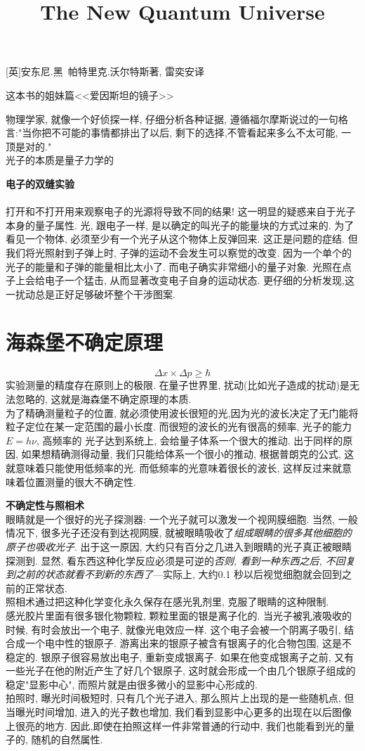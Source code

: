 \documentclass{article}
\begin{document}
\title{The New Quantum Universe}
[英]安东尼.黑\ 帕特里克.沃尔特斯著, 雷奕安译

这本书的姐妹篇<<爱因斯坦的镜子>>

物理学家, 就像一个好侦探一样, 仔细分析各种证据, 遵循福尔摩斯说过的一句格言:"当你把不可能的事情都排出了以后, 剩下的选择,不管看起来多么不太可能, 一顶是对的."  \\
光子的本质是量子力学的

\textbf{电子的双缝实验}\\
\\
打开和不打开用来观察电子的光源将导致不同的结果! 这一明显的疑惑来自于光子本身的量子属性. 光, 跟电子一样, 是以确定的叫光子的能量块的方式过来的. 为了看见一个物体, 必须至少有一个光子从这个物体上反弹回来. 这正是问题的症结. 但我们将光照射到子弹上时, 子弹的运动不会发生可以察觉的改变. 因为一个单个的光子的能量和子弹的能量相比太小了. 而电子确实非常细小的量子对象. 光照在点子上会给电子一个猛击, 从而显著改变电子自身的运动状态. 更仔细的分析发现,这一扰动总是正好足够破坏整个干涉图案.
\bigskip

\section{海森堡不确定原理}
$$
\Delta x\times \Delta p \geq \hbar
$$
实验测量的精度存在原则上的极限. 在量子世界里, 扰动(比如光子造成的扰动)是无法忽略的, 这就是海森堡不确定原理的本质.\\
为了精确测量粒子的位置, 就必须使用波长很短的光,因为光的波长决定了无门能将粒子定位在某一定范围的最小长度. 而很短的波长的光有很高的频率, 光子的能力$E=h\nu$, 高频率的
光子达到系统上, 会给量子体系一个很大的推动. 出于同样的原因, 如果想精确测得动量, 我们只能给体系一个很小的推动, 根据普朗克的公式, 这就意味着只能使用低频率的光. 而低频率的光意味着很长的波长, 这样反过来就意味着位置测量的很大不确定性.
\bigskip

\textbf{不确定性与照相术}\\
眼睛就是一个很好的光子探测器: 一个光子就可以激发一个视网膜细胞. 当然, 一般情况下, 很多光子还没有到达视网膜, 就被眼睛吸收了\textit{组成眼睛的很多其他细胞的原子也吸收光子}.
出于这一原因, 大约只有百分之几进入到眼睛的光子真正被眼睛探测到. 显然, 看东西这种化学反应必须是可逆的\textit{否则, 看到一种东西之后, 不回复到之前的状态就看不到新的东西了}---实际上, 大约0.1 秒以后视觉细胞就会回到之前的正常状态. \\
照相术通过把这种化学变化永久保存在感光乳剂里, 克服了眼睛的这种限制.\\
感光胶片里面有很多银化物颗粒, 颗粒里面的银是离子化的. 当光子被乳液吸收的时候, 有时会放出一个电子, 就像光电效应一样. 这个电子会被一个阴离子吸引, 结合成一个电中性的银原子.
游离出来的银原子被含有银离子的化合物包围, 这是不稳定的. 银原子很容易放出电子, 重新变成银离子. 如果在他变成银离子之前, 又有一些光子在他的附近产生了好几个银原子, 这时就会形成一个由几个银原子组成的稳定"显影中心", 而照片就是由很多微小的显影中心形成的.\\
拍照时, 曝光时间极短时, 只有几个光子进入, 那么照片上出现的是一些随机点, 但当曝光时间增加, 进入的光子数也增加, 我们看到显影中心更多的出现在以后图像上很亮的地方. 因此,即使在拍照这样一件非常普通的行动中, 我们也能看到光的量子的, 随机的自然属性.
\bigskip
\end{document}
